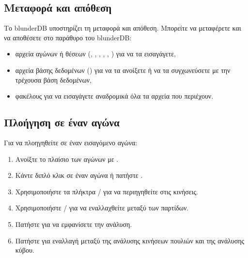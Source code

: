 \documentclass[letterpaper,10pt,greek]{sphinxmanual}
\begin{document}
\subsection{Μεταφορά και απόθεση}
\label{\detokenize{guide_utilisateur:glisser-deposer}}
\sphinxAtStartPar
Το blunderDB υποστηρίζει τη μεταφορά και απόθεση. Μπορείτε να μεταφέρετε και να αποθέσετε στο παράθυρο του blunderDB:
\begin{itemize}
\item {} 
\sphinxAtStartPar
αρχεία αγώνων ή θέσεων (, , , , , ) για να τα εισαγάγετε,

\item {} 
\sphinxAtStartPar
αρχεία βάσης δεδομένων () για να τα ανοίξετε ή να τα συγχωνεύσετε με την τρέχουσα βάση δεδομένων,

\item {} 
\sphinxAtStartPar
φακέλους για να εισαγάγετε αναδρομικά όλα τα αρχεία που περιέχουν.

\end{itemize}


\subsection{Πλοήγηση σε έναν αγώνα}
\label{\detokenize{guide_utilisateur:naviguer-dans-un-match}}
\sphinxAtStartPar
Για να πλοηγηθείτε σε έναν εισαγόμενο αγώνα:
\begin{enumerate}
%
\item {} 
\sphinxAtStartPar
Ανοίξτε το πλαίσιο των αγώνων με .

\item {} 
\sphinxAtStartPar
Κάντε διπλό κλικ σε έναν αγώνα ή πατήστε .

\item {} 
\sphinxAtStartPar
Χρησιμοποιήστε τα πλήκτρα  /  για να περιηγηθείτε στις κινήσεις.

\item {} 
\sphinxAtStartPar
Χρησιμοποιήστε  /  για να εναλλαχθείτε μεταξύ των παρτίδων.

\item {} 
\sphinxAtStartPar
Πατήστε  για να εμφανίσετε την ανάλυση.

\item {} 
\sphinxAtStartPar
Πατήστε  για εναλλαγή μεταξύ της ανάλυσης κινήσεων πουλιών και της ανάλυσης κύβου.

\end{enumerate}
\end{document}

